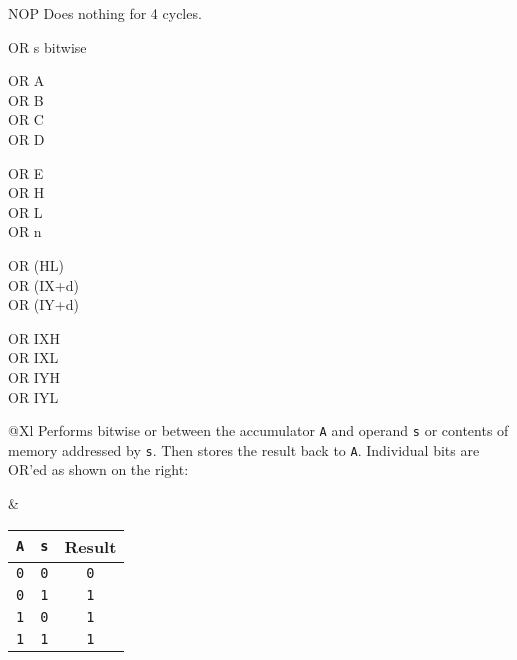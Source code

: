 \begin{basedescript}{
	\desclabelstyle{\multilinelabel}
	\desclabelwidth{3cm}}
\begin{DetailItem}{NOP}
		Does nothing for 4 cycles.
		
		\begin{DetailEffects}
			\FlagsNOP
		\end{DetailEffects}
						
		\begin{DetailTiming}
		\end{DetailTiming}

	\end{DetailItem}

	\begin{DetailItem}{OR s}
		{bitwise }
		{}

		\begin{DetailVariants}[4]
			OR A\\
			OR B\\
			OR C\\
			OR D

			\columnbreak
			OR E\\
			OR H\\
			OR L\\
			OR n

			\columnbreak
			OR (HL)\\
			OR (IX+d)\\
			OR (IY+d)

			\columnbreak
			OR IXH\UNDOC\\
			OR IXL\UNDOC\\
			OR IYH\UNDOC\\
			OR IYL\UNDOC
		\end{DetailVariants}

		\begin{tabularx}{\linewidth}{@{}Xl}
			Performs bitwise or between the accumulator {\tt A} and operand {\tt s} or contents of memory addressed by {\tt s}. Then stores the result back to {\tt A}. Individual bits are OR'ed as shown on the right:
	
			&

			\begin{tabular}[t]{cc|c}
				{\tt A} & {\tt s} & Result \\
				\hline
				{\tt 0} & {\tt 0} & {\tt 0} \\
				{\tt 0} & {\tt 1} & {\tt 1} \\
				{\tt 1} & {\tt 0} & {\tt 1} \\
				{\tt 1} & {\tt 1} & {\tt 1} \\
			\end{tabular}

			\\
		\end{tabularx}


\end{DetailItem}
\end{basedescript}

